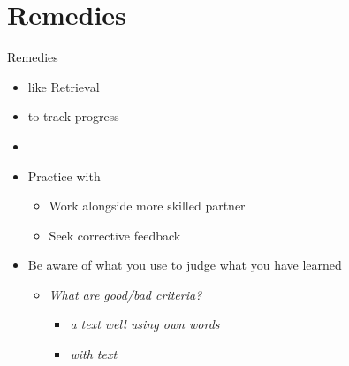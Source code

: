 \documentclass{ercisbeamer}
\begin{document}
\section{Remedies}
\begin{frame}{Remedies}
    \begin{itemize}
        \item {} like Retrieval
        \item {} to track progress
        \item {}
        \item Practice with 
        \begin{itemize}
            \item Work alongside more skilled partner
            \item Seek corrective feedback
        \end{itemize}
        \item Be aware of what  you use to judge what you have learned
        \begin{itemize}
            \item \emph{What are good/bad criteria?} \pause
            \begin{itemize}
                \item \emph{ a text well using own words}
                \item \emph{ with text}
            \end{itemize}
        \end{itemize}
    \end{itemize}
\end{frame}



\sources
\end{document}
